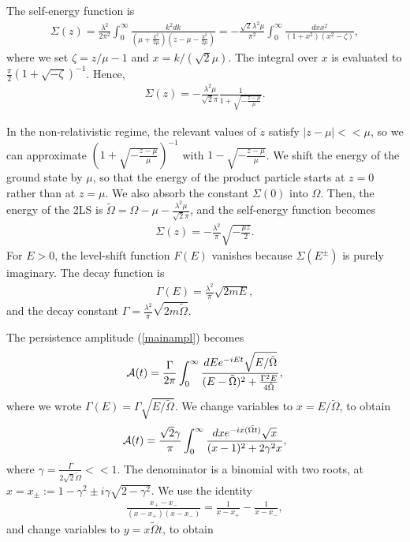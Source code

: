 \documentclass[12pt]{article}
\numberwithin{equation}{section}
\begin{document}
The self-energy function is
\begin{eqnarray}
\Sigma(z) = \frac{\lambda^2}{2 \pi^2} \int_0^{\infty} \frac{k^2 dk}{\left(\mu + \frac{k^2}{2\mu}\right) \left(z - \mu - \frac{k^2}{2\mu}\right)} = -  \frac{\sqrt{2}\lambda^2\mu}{\pi^2}\int_0^{\infty} \frac{dxx^2}{(1+x^2)(x^2 - \zeta)},
\end{eqnarray}
where we set $\zeta = z/\mu - 1$ and $x = k/(\sqrt{2}\mu)$.  The integral over $x$ is evaluated to $\frac{\pi}{2}(1 +\sqrt{-\zeta})^{-1}$. Hence,
\begin{eqnarray}
\Sigma(z) =  -  \frac{\lambda^2\mu}{\sqrt{2}\pi} \frac{1}{1 + \sqrt{ - \frac{z - \mu}{\mu}}}. \label{sigmazint}
\end{eqnarray}

In the non-relativistic regime, the relevant values of $z$ satisfy $|z - \mu| << \mu$, so we can approximate $(1 + \sqrt{ - \frac{z - \mu}{\mu}})^{-1}$ with $1 -  \sqrt{ -\frac{z - \mu}{\mu}}$. We shift the  energy of  the ground state by $\mu$, so that the energy of the  product  particle starts at  $z = 0$ rather than at $z = \mu$. We also absorb the constant $\Sigma(0)$ into $\Omega$. Then, the  energy of the 2LS is $\tilde{\Omega} = \Omega - \mu  -  \frac{\lambda^2\mu}{\sqrt{2}\pi}$, and the self-energy function becomes
\begin{eqnarray}
\Sigma(z) =  -  \frac{\lambda^2}{\pi} \sqrt{-\frac{\mu z}{2}} . \label{sigmazin}
\end{eqnarray}
For $E > 0$, the level-shift function $F(E)$ vanishes because $\Sigma(E^{\pm})$ is purely imaginary. The decay function is
\begin{eqnarray}
\Gamma(E) = \frac{\lambda^2}{\pi} \sqrt{2m E},
\end{eqnarray}
and the decay constant  $\Gamma = \frac{\lambda^2}{\pi} \sqrt{2m \tilde{\Omega}}$.

The persistence amplitude (\ref{mainampl}) becomes
\begin{eqnarray}
{\cal A}(t) = \frac{\Gamma}{2\pi} \int_0^{\infty} \frac{dE e^{-iEt} \sqrt{E/\tilde{\Omega}}}{(E - \tilde{\Omega})^2 + \frac{\Gamma^2E}{4\tilde{\Omega}}},
\end{eqnarray}
where we wrote $\Gamma(E) = \Gamma \sqrt{E/\tilde{\Omega}}$. We change variables to $x = E/\tilde{\Omega}$, to obtain
\begin{eqnarray}
{\cal A}(t) = \frac{\sqrt{2}\gamma}{\pi} \int_0^{\infty} \frac{dx e^{-ix (\tilde{\Omega t})} \sqrt{x}}{(x-1)^2+ 2 \gamma^2 x},
\end{eqnarray}
where $\gamma = \frac{\Gamma}{2\sqrt{2}\tilde{\Omega}} << 1$. The denominator is a binomial with two roots, at $x = x_{\pm}:= 1- \gamma^2 \pm i \gamma\sqrt{2-\gamma^2}$. We use the identity
\begin{eqnarray}
\frac{x_+-x_-}{(x-x_+)(x-x_-)} = \frac{1}{x-x_+} - \frac{1}{x-x_-},
\end{eqnarray}
and change variables to $y = x \tilde{\Omega}t$, to obtain
\end{document}

